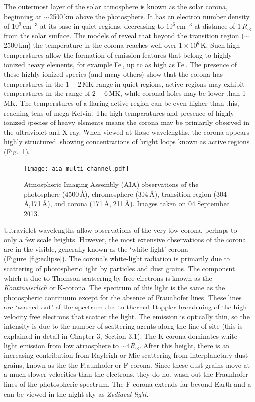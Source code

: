 The outermost layer of the solar atmosphere is known as the solar corona, beginning at $\sim$2500\,km above the photosphere. It has an electron number density of $10^{9}$\,cm$^{-3}$ at its base in quiet regions, decreasing to $10^{6}$\,cm$^{-3}$ at distance of $1\,R_{\odot}$ from the solar surface. The models of \citep{vernazza1981, fontenla1988, gabriel1976} reveal that beyond the transition region ($\sim$2500\,km) the temperature in the corona reaches well over $1\times10^{6}$\,K. Such high temperatures allow the formation of emission features that belong to highly ionized heavy elements, for example Fe\,, up to as high as Fe\,. The presence of these highly ionized species (and many others) show that the corona has temperatures in the $1-2$\,MK range in quiet regions, active regions may exhibit temperatures in the range of $2-6$\,MK, while coronal holes may be lower than 1\,MK. The temperatures of a flaring active region can be even higher than this, reaching tens of mega-Kelvin. The high temperatures and presence of highly ionized species of heavy elements means the corona may be primarily observed in the ultraviolet and X-ray. When viewed at these wavelengths, the corona appears highly structured, showing concentrations of bright loops known as active regions (Fig.~\ref{fig:aia_corona}).
\begin{figure}[!t]
\begin{center}
\texttt{[image: aia\_multi\_channel.pdf]}
\caption[AIA image of the corona]{Atmospheric Imaging Assembly (AIA) observations of the photosphere (4500\,\AA), chromosphere (304\,\AA), transition region (304\,\AA,171\,\AA), and corona (171\,\AA, 211\,\AA). Images taken on 04 September 2013.}
\label{fig:aia_corona} 
\end{center}
\end{figure}

Ultraviolet wavelengths allow observations of the very low corona, perhaps to only a few scale heights. However, the most extensive observations of the corona are in the visible, generally known as the `white-light' corona (Figure~\ref{fig:eclipse}). The corona's white-light radiation is primarily due to scattering of photospheric light by particles and dust grains. The component which is due to Thomson scattering by free electrons is known as the {\it Kontinuierlich} or K-corona. The spectrum of this light is the same as the photospheric continuum except for the absence of Fraunhofer lines. These lines are `washed-out' of the spectrum due to thermal Doppler broadening of the high-velocity free electrons that scatter the light. The emission is optically thin, so the intensity is due to the number of scattering agents along the line of site (this is explained in detail in Chapter 3, Section 3.1). The K-corona dominates white-light emission from low atmosphere to $\sim$4$R_{\odot}$. After this height, there is an increasing contribution from Rayleigh or Mie scattering from interplanetary dust grains, known as the the Fraunhofer or F-corona. Since these dust grains move at a much slower velocities than the electrons, they do not wash out the Fraunhofer lines of the photospheric spectrum. The F-corona extends far beyond Earth and a can be viewed in the night sky as {\it Zodiacal light}.

